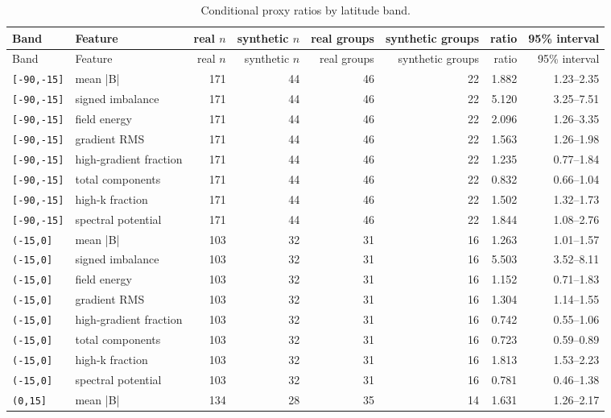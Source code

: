 \scriptsize
\setlength{\tabcolsep}{2pt}
\begin{longtable}{p{}p{}rrrrrr}
\caption{Conditional proxy ratios by latitude band.}\label{tab:conditional-proxies}\\
\toprule
Band & Feature & real $n$ & synthetic $n$ & real groups & synthetic groups & ratio & 95\% interval\\
\midrule
\endfirsthead\toprule
Band & Feature & real $n$ & synthetic $n$ & real groups & synthetic groups & ratio & 95\% interval\\
\midrule\endhead
\texttt{[-90,-15]} & mean |B| & 171 & 44 & 46 & 22 & 1.882 & 1.23--2.35\\
\texttt{[-90,-15]} & signed imbalance & 171 & 44 & 46 & 22 & 5.120 & 3.25--7.51\\
\texttt{[-90,-15]} & field energy & 171 & 44 & 46 & 22 & 2.096 & 1.26--3.35\\
\texttt{[-90,-15]} & gradient RMS & 171 & 44 & 46 & 22 & 1.563 & 1.26--1.98\\
\texttt{[-90,-15]} & high-gradient fraction & 171 & 44 & 46 & 22 & 1.235 & 0.77--1.84\\
\texttt{[-90,-15]} & total components & 171 & 44 & 46 & 22 & 0.832 & 0.66--1.04\\
\texttt{[-90,-15]} & high-k fraction & 171 & 44 & 46 & 22 & 1.502 & 1.32--1.73\\
\texttt{[-90,-15]} & spectral potential & 171 & 44 & 46 & 22 & 1.844 & 1.08--2.76\\
\texttt{(-15,0]} & mean |B| & 103 & 32 & 31 & 16 & 1.263 & 1.01--1.57\\
\texttt{(-15,0]} & signed imbalance & 103 & 32 & 31 & 16 & 5.503 & 3.52--8.11\\
\texttt{(-15,0]} & field energy & 103 & 32 & 31 & 16 & 1.152 & 0.71--1.83\\
\texttt{(-15,0]} & gradient RMS & 103 & 32 & 31 & 16 & 1.304 & 1.14--1.55\\
\texttt{(-15,0]} & high-gradient fraction & 103 & 32 & 31 & 16 & 0.742 & 0.55--1.06\\
\texttt{(-15,0]} & total components & 103 & 32 & 31 & 16 & 0.723 & 0.59--0.89\\
\texttt{(-15,0]} & high-k fraction & 103 & 32 & 31 & 16 & 1.813 & 1.53--2.23\\
\texttt{(-15,0]} & spectral potential & 103 & 32 & 31 & 16 & 0.781 & 0.46--1.38\\
\texttt{(0,15]} & mean |B| & 134 & 28 & 35 & 14 & 1.631 & 1.26--2.17\\

\end{longtable}
